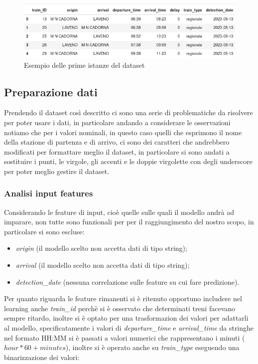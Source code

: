 \documentclass[italian,12pt,a4paper]{article}
\begin{document}
				\begin{figure}[!h]
					\centering
					\includegraphics[width=1.1\linewidth]{img/dataset}
					\caption{Esempio delle prime istanze del dataset}
				\end{figure}
	
		\subsection{Preparazione dati}
			Prendendo il dataset così descritto ci sono una serie di problematiche da risolvere per poter usare i dati, in particolare andando a considerare le osservazioni notiamo che per i valori nominali, in questo caso quelli che esprimono il nome della stazione di partenza e di arrivo, ci sono dei caratteri che andrebbero modificati per formattare meglio il dataset, in particolare si sono andati a sostituire i punti, le virgole, gli accenti e le doppie virgolette con degli underscore per poter meglio gestire il dataset.
		
			\subsubsection{Analisi input features}
				Considerando le feature di input, cioè quelle sulle quali il modello andrà ad imparare, non tutte sono funzionali per per il raggiungimento del nostro scopo, in particolare si sono escluse:
				
				\begin{itemize}
					\item \textit{origin} (il modello scelto non accetta dati di tipo string);
					\item \textit{arrival} (il modello scelto non accetta dati di tipo string);
					\item \textit{detection\_date} (nessuna correlazione sulle feature su cui fare predizione).
				\end{itemize}
				
				Per quanto riguarda le feature rimanenti si è ritenuto opportuno includere nel learning anche \textit{train\_id} perchè si è osservato che determinati treni facevano sempre ritardo, inoltre si è optato per una trasformazion dei valori per adattarli al modello, specificatamente i valori di \textit{departure\_time} e \textit{arrival\_time} da stringhe nel formato HH:MM si è passati a valori numerici che rappresentano i minuti ($hour*60+minutes$), inoltre si è operato anche su \textit{train\_type} eseguendo una binarizzazione dei valori:
				
\end{document}
